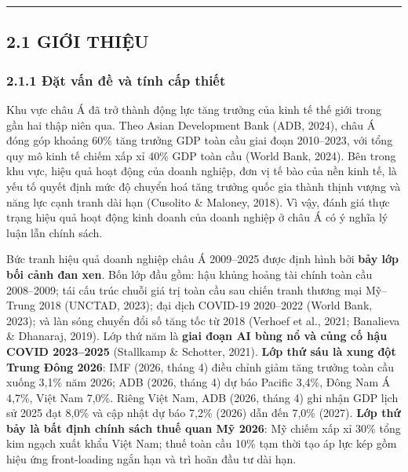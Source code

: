 \documentclass[12pt,a4paper]{article}
\begin{document}
\begin{center}\rule{0.5\linewidth}{0.5pt}\end{center}

\hypertarget{21-giux1edbi-thiux1ec7u}{%
\subsection{2.1 GIỚI THIỆU}\label{21-giux1edbi-thiux1ec7u}}

\hypertarget{211-ux111ux1eb7t-vux1ea5n-ux111ux1ec1-vuxe0-tuxednh-cux1ea5p-thiux1ebft}{%
\subsubsection{2.1.1 Đặt vấn đề và tính cấp
thiết}\label{211-ux111ux1eb7t-vux1ea5n-ux111ux1ec1-vuxe0-tuxednh-cux1ea5p-thiux1ebft}}

Khu vực châu Á đã trở thành động lực tăng trưởng của kinh tế thế giới
trong gần hai thập niên qua. Theo Asian Development Bank (ADB, 2024),
châu Á đóng góp khoảng 60\% tăng trưởng GDP toàn cầu giai đoạn
2010--2023, với tổng quy mô kinh tế chiếm xấp xỉ 40\% GDP toàn cầu
(World Bank, 2024). Bên trong khu vực, hiệu quả hoạt động của doanh
nghiệp, đơn vị tế bào của nền kinh tế, là yếu tố quyết định mức độ
chuyển hoá tăng trưởng quốc gia thành thịnh vượng và năng lực cạnh tranh
dài hạn (Cusolito \& Maloney, 2018). Vì vậy, đánh giá thực trạng hiệu
quả hoạt động kinh doanh của doanh nghiệp ở châu Á có ý nghĩa lý luận
lẫn chính sách.

Bức tranh hiệu quả doanh nghiệp châu Á 2009--2025 được định hình bởi
\textbf{bảy lớp bối cảnh đan xen}. Bốn lớp đầu gồm: hậu khủng hoảng tài
chính toàn cầu 2008--2009; tái cấu trúc chuỗi giá trị toàn cầu sau chiến
tranh thương mại Mỹ--Trung 2018 (UNCTAD, 2023); đại dịch COVID-19
2020--2022 (World Bank, 2023); và làn sóng chuyển đổi số tăng tốc từ
2018 (Verhoef et al., 2021; Banalieva \& Dhanaraj, 2019). Lớp thứ năm là
\textbf{giai đoạn AI bùng nổ và củng cố hậu COVID 2023--2025} (Stallkamp
\& Schotter, 2021). \textbf{Lớp thứ sáu là xung đột Trung Đông 2026}:
IMF (2026, tháng 4) điều chỉnh giảm tăng trưởng toàn cầu xuống 3,1\% năm
2026; ADB (2026, tháng 4) dự báo Pacific 3,4\%, Đông Nam Á 4,7\%, Việt
Nam 7,0\%. Riêng Việt Nam, ADB (2026, tháng 4) ghi nhận GDP lịch sử 2025
đạt 8,0\% và cập nhật dự báo 7,2\% (2026) dẫn đến 7,0\% (2027).
\textbf{Lớp thứ bảy là bất định chính sách thuế quan Mỹ 2026}: Mỹ chiếm
xấp xỉ 30\% tổng kim ngạch xuất khẩu Việt Nam; thuế toàn cầu 10\% tạm
thời tạo áp lực kép gồm hiệu ứng front-loading ngắn hạn và trì hoãn đầu
tư dài hạn.
\end{document}
